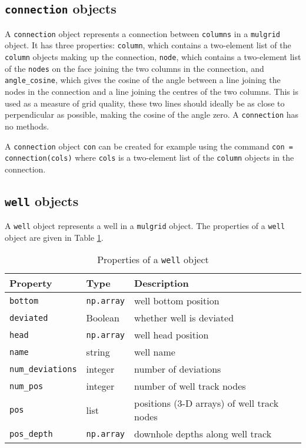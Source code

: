 \subsection{\texttt{connection} objects}
\label{connections}

A \texttt{connection} object represents a connection between \texttt{columns} in a \texttt{mulgrid} object.  It has three properties: \texttt{column}, which contains a two-element list of the \texttt{column} objects making up the connection, \texttt{node}, which contains a two-element list of the \texttt{nodes} on the face joining the two columns in the connection, and \texttt{angle\_cosine}, which gives the cosine of the angle between a line joining the nodes in the connection and a line joining the centres of the two columns.  This is used as a measure of grid quality, these two lines should ideally be as close to perpendicular as possible, making the cosine of the angle zero.  A \texttt{connection} has no methods.

A \texttt{connection} object \texttt{con} can be created for example using the command \texttt{con = connection(cols)} where \texttt{cols} is a two-element list of the \texttt{column} objects in the connection.

\subsection{\texttt{well} objects}

A \texttt{well} object represents a well in a \texttt{mulgrid} object.  The properties of a \texttt{well} object are given in Table \ref{tb:well_properties}.

\begin{table}
  \begin{center}
    \begin{tabular}{|l|l|l|}
      \hline
      \textbf{Property} & \textbf{Type} & \textbf{Description}\\
      \hline
      \texttt{bottom} & \texttt{np.array} & well bottom position \\
      \texttt{deviated} & Boolean &  whether well is deviated\\
      \texttt{head} & \texttt{np.array} & well head position \\
      \texttt{name} & string & well name \\
      \texttt{num\_deviations} & integer & number of deviations \\
      \texttt{num\_pos} & integer & number of well track nodes \\
      \texttt{pos} & list & positions (3-D arrays) of well track nodes \\
      \texttt{pos\_depth} & \texttt{np.array} & downhole depths along well track \\
      \hline
    \end{tabular}
    \caption{Properties of a \texttt{well} object}
    \label{tb:well_properties}
  \end{center}
\end{table}

